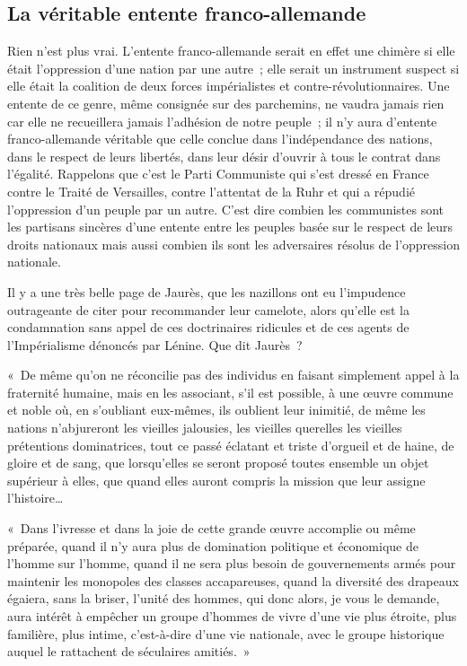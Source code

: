 \documentclass[french,twoside]{book} %
\newenvironment{quoteblock}%
  {\begin{quoting}}
  {\end{quoting}}
\newenvironment{quotebar}{%
    \def\FrameCommand{{\color{rubric!10!}\vrule width 0.5em} \hspace{0.9em}}%
    \def\OuterFrameSep{\itemsep} %
    \MakeFramed {\advance\hsize-\width \FrameRestore}
  }%
  {%
    \endMakeFramed
  }
\renewenvironment{quoteblock}%
  {%
    \savenotes
    \setstretch{0.9}
    \normalfont
    \begin{quotebar}
  }
  {%
    \end{quotebar}
    \spewnotes
  }
\begin{document}
\subsection[La véritable entente franco-allemande]{La véritable entente franco-allemande}
\noindent Rien n’est plus vrai. L’entente franco-allemande serait en effet une chimère si elle était l’oppression d’une nation par une autre ; elle serait un instrument suspect si elle était la coalition de deux forces impérialistes et contre-révolutionnaires. Une entente de ce genre, même consignée sur des parchemins, ne vaudra jamais rien car elle ne recueillera jamais l’adhésion de notre peuple ; il n’y aura d’entente franco-allemande véritable que celle conclue dans l’indépendance des nations, dans le respect de leurs libertés, dans leur désir d’ouvrir à tous le contrat dans l’égalité. Rappelons que c’est le Parti Communiste qui s’est dressé en France contre le Traité de Versailles, contre l’attentat de la Ruhr et qui a répudié l’oppression d’un peuple par un autre. C’est dire combien les communistes sont les partisans sincères d’une entente entre les peuples basée sur le respect de leurs droits nationaux mais aussi combien ils sont les adversaires résolus de l’oppression nationale.\par
Il y a une très belle page de Jaurès, que les nazillons ont eu l’impudence outrageante de citer pour recommander leur camelote, alors qu’elle est la condamnation sans appel de ces doctrinaires ridicules et de ces agents de l’Impérialisme dénoncés par Lénine. Que dit Jaurès ?\par

\begin{quoteblock}
 \noindent « De même qu’on ne réconcilie pas des individus en faisant simplement appel à la fraternité humaine, mais en les associant, s’il est possible, à une œuvre commune et noble où, en s’oubliant eux-mêmes, ils oublient leur inimitié, de même les nations n’abjureront les vieilles jalousies, les vieilles querelles les vieilles prétentions dominatrices, tout ce passé éclatant et triste d’orgueil et de haine, de gloire et de sang, que lorsqu’elles se seront proposé toutes ensemble un objet supérieur à elles, que quand elles auront compris la mission que leur assigne l’histoire…\par
 « Dans l’ivresse et dans la joie de cette grande œuvre accomplie ou même préparée, quand il n’y aura plus de domination politique et économique de l’homme sur l’homme, quand il ne sera plus besoin de gouvernements armés pour maintenir les monopoles des classes accapareuses, quand la diversité des drapeaux égaiera, sans la briser, l’unité des hommes, qui donc alors, je vous le demande, aura intérêt à empêcher un groupe d’hommes de vivre d’une vie plus étroite, plus familière, plus intime, c’est-à-dire d’une vie nationale, avec le groupe historique auquel le rattachent de séculaires amitiés. »
 \end{quoteblock}
\end{document}
